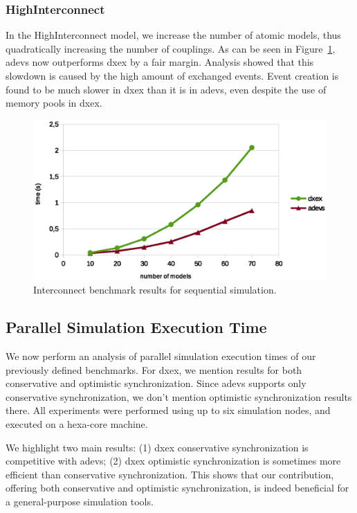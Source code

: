 \subsubsection{HighInterconnect}
In the HighInterconnect model, we increase the number of atomic models, thus quadratically increasing the number of couplings.
As can be seen in Figure~\ref{fig:Interconnect_benchmark}, adevs now outperforms dxex by a fair margin.
Analysis showed that this slowdown is caused by the high amount of exchanged events.
Event creation is found to be much slower in dxex than it is in adevs, even despite the use of memory pools in dxex.

\begin{figure}
	\includegraphics[width=\columnwidth]{fig/interconnect_sequential.eps}
	\caption{Interconnect benchmark results for sequential simulation.}
	\label{fig:Interconnect_benchmark}
\end{figure}

\subsection{Parallel Simulation Execution Time}
We now perform an analysis of parallel simulation execution times of our previously defined benchmarks.
For dxex, we mention results for both conservative and optimistic synchronization.
Since adevs supports only conservative synchronization, we don't mention optimistic synchronization results there.
All experiments were performed using up to six simulation nodes, and executed on a hexa-core machine.

We highlight two main results:
(1) dxex conservative synchronization is competitive with adevs;
(2) dxex optimistic synchronization is sometimes more efficient than conservative synchronization.
This shows that our contribution, offering both conservative and optimistic synchronization, is indeed beneficial for a general-purpose simulation tools.

